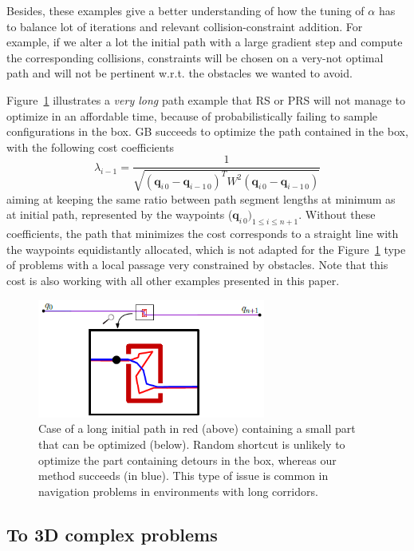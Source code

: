 \documentclass{tADR2e}
\newcommand\conf{\mathbf{q}}
\newcommand\weight{W}
\begin{document}
Besides, these examples give a better understanding of how the tuning of $\alpha$ 
has to balance lot of iterations and relevant collision-constraint addition. For 
example, if we alter a lot the initial path with a large gradient step and 
compute the corresponding collisions, constraints will be chosen on a very-not 
optimal path and will not be pertinent w.r.t. the obstacles we wanted to 
avoid.

Figure~\ref{local_box_optim} illustrates a \textit{very long} path example that RS 
or PRS will not manage to 
optimize in an affordable time, because of probabilistically failing to sample 
configurations in the box. GB succeeds to optimize the 
path contained in the box, with the following cost coefficients 
$$
\lambda_{i-1} = \frac{1}{\sqrt{(\conf_{i\,0}-\conf_{i-1\,0})^T \weight^2 
(\conf_{i\,0}-\conf_{i-1\,0})}}
$$
aiming at keeping the same ratio between path segment lengths at 
minimum as at 
initial path, represented by the waypoints ($\conf_{i\,0})_{1\leq i\leq n+1}$.
Without these coefficients, the path that minimizes the cost corresponds to a 
straight line with the waypoints equidistantly allocated, which is not adapted for 
the Figure~\ref{local_box_optim} type of problems with a local passage very
constrained by obstacles. Note that this cost is also working with all other 
examples presented in this paper.


\begin{figure}[t]
	\centering
	\includegraphics[width=7.5cm]{local_box_optim.png}
	\caption{Case of a long initial path in red (above) containing a small part 
	that can 
	be optimized (below). Random shortcut is unlikely to optimize the part 
	containing detours in the box, whereas our method 
	succeeds (in blue). This type of issue is common in navigation problems in 
	environments with long corridors.}
	\label{local_box_optim}
\end{figure}



\subsection{To 3D complex problems}
\end{document}
